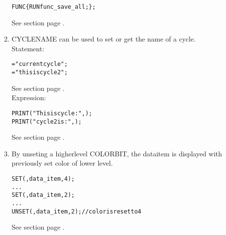 \begin{enumerate}
\begin{boxedminipage}[t]{\linewidth}
\begin{alltt}
  FUNC \QUIT \{ RUN func_save_all; \};
\end{alltt}
\end{boxedminipage}

See section  page \pageref{sec:funcidentifiers}. \\

\item CYCLENAME can be used to set or get the name of a cycle. \\
Statement:

\begin{boxedminipage}[t]{\linewidth}
\begin{alltt}
  \CYCLENAME = "current cycle";
  \CYCLENAME[2] = "this is cycle 2";
\end{alltt}
\end{boxedminipage}

See section  page \pageref{fucyclestatements}. \\
Expression:

\begin{boxedminipage}[t]{\linewidth}
\begin{alltt}
  PRINT("This is cycle:",\CYCLENAME);
  PRINT("cycle 2 is:",\CYCLENAME[2]);
\end{alltt}
\end{boxedminipage}

See section  page \pageref{fuexpressionscycle}. \\

\label{relnotescolorbit}
\item By unseting a higherlevel COLORBIT, the dataitem is displayed with previously set color of lower level.

\begin{boxedminipage}[t]{\linewidth}
\begin{alltt}
  SET( \COLORBIT, data_item, 4 );
  ...
  SET( \COLORBIT, data_item, 2 );
  ...
  UNSET( \COLORBIT, data_item, 2 );  // color is reset to 4
\end{alltt}
\end{boxedminipage}

See section  page \pageref{fudatastatementset}. \\


\end{enumerate}
